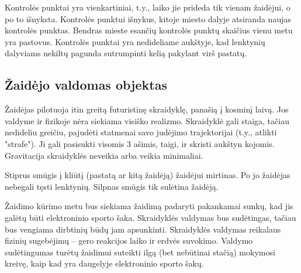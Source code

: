 Kontrolės punktai yra vienkartiniai, t.y., laiko jie prideda tik vienam žaidėjui, o po to išnyksta.
Kontrolės punktui išnykus, kitoje miesto dalyje atsiranda naujas kontrolės punktas.
Bendras mieste esančių kontrolės punktų skaičius vienu metu yra pastovus.
Kontrolės punktai yra nedideliame aukštyje, kad lenktynių dalyviams nekiltų pagunda sutrumpinti kelią pakylant virš pastatų.

\subsection{Žaidėjo valdomas objektas}


Žaidėjas pilotuoja itin greitą futuristinę skraidyklę, panašią į kosminį laivą.
Jos valdyme ir fizikoje nėra siekiama visiško realizmo.
Skraidyklė gali staiga, tačiau nedideliu greičiu, pajudėti statmenai savo judėjimo trajektorijai (t.y., atlikti "strafe").
Ji gali pasisukti visomis 3 ašimis, taigi, ir skristi aukštyn kojomis.
Gravitacija skraidyklės neveikia arba veikia minimaliai.

Stiprus smūgis į kliūtį (pastatą ar kitą žaidėją) žaidėjui mirtinas.
Po jo žaidėjas nebegali tęsti lenktynių.
Silpnas smūgis tik sulėtina žaidėją.

Žaidimo kūrimo metu bus siekiama žaidimą padaryti pakankamai sunkų, kad jis galėtų būti elektroninio sporto šaka.
Skraidyklės valdymas bus sudėtingas, tačiau bus vengiama dirbtinių būdų jam apsunkinti.
Skraidyklės valdymas reikalaus fizinių sugebėjimų -- gero reakcijos laiko ir erdvės suvokimo.
Valdymo sudėtingumas turėtų žaidimui suteikti ilgą (bet nebūtinai stačią) mokymosi kreivę, kaip kad yra daugelyje elektroninio sporto šakų.
